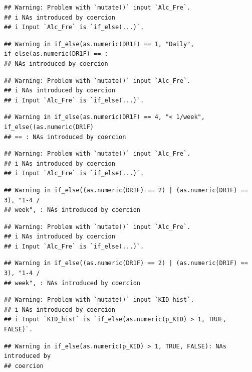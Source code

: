 \documentclass[
]{article}
\begin{document}
\begin{verbatim}
## Warning: Problem with `mutate()` input `Alc_Fre`.
## i NAs introduced by coercion
## i Input `Alc_Fre` is `if_else(...)`.
\end{verbatim}

\begin{verbatim}
## Warning in if_else(as.numeric(DR1F) == 1, "Daily", if_else(as.numeric(DR1F) == :
## NAs introduced by coercion
\end{verbatim}

\begin{verbatim}
## Warning: Problem with `mutate()` input `Alc_Fre`.
## i NAs introduced by coercion
## i Input `Alc_Fre` is `if_else(...)`.
\end{verbatim}

\begin{verbatim}
## Warning in if_else(as.numeric(DR1F) == 4, "< 1/week", if_else((as.numeric(DR1F)
## == : NAs introduced by coercion
\end{verbatim}

\begin{verbatim}
## Warning: Problem with `mutate()` input `Alc_Fre`.
## i NAs introduced by coercion
## i Input `Alc_Fre` is `if_else(...)`.
\end{verbatim}

\begin{verbatim}
## Warning in if_else((as.numeric(DR1F) == 2) | (as.numeric(DR1F) == 3), "1-4 /
## week", : NAs introduced by coercion
\end{verbatim}

\begin{verbatim}
## Warning: Problem with `mutate()` input `Alc_Fre`.
## i NAs introduced by coercion
## i Input `Alc_Fre` is `if_else(...)`.
\end{verbatim}

\begin{verbatim}
## Warning in if_else((as.numeric(DR1F) == 2) | (as.numeric(DR1F) == 3), "1-4 /
## week", : NAs introduced by coercion
\end{verbatim}

\begin{verbatim}
## Warning: Problem with `mutate()` input `KID_hist`.
## i NAs introduced by coercion
## i Input `KID_hist` is `if_else(as.numeric(p_KID) > 1, TRUE, FALSE)`.
\end{verbatim}

\begin{verbatim}
## Warning in if_else(as.numeric(p_KID) > 1, TRUE, FALSE): NAs introduced by
## coercion
\end{verbatim}
\end{document}
